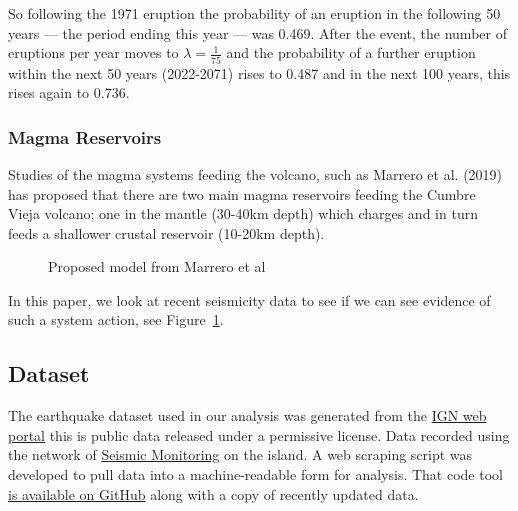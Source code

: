 \documentclass[
]{agujournal2019}
\begin{document}
So following the 1971 eruption the probability of an eruption in the
following 50 years --- the period ending this year --- was 0.469. After
the event, the number of eruptions per year moves to
\(\lambda=\frac{1}{75}\) and the probability of a further eruption
within the next 50 years (2022-2071) rises to 0.487 and in the next 100
years, this rises again to 0.736.

\subsubsection{Magma Reservoirs}\label{magma-reservoirs}

Studies of the magma systems feeding the volcano, such as Marrero et al.
(2019) has proposed that there are two main magma reservoirs feeding the
Cumbre Vieja volcano; one in the mantle (30-40km depth) which charges
and in turn feeds a shallower crustal reservoir (10-20km depth).

\begin{figure}


\caption{\label{fig-reservoirs}Proposed model from Marrero et al}

\end{figure}%

In this paper, we look at recent seismicity data to see if we can see
evidence of such a system action, see Figure~\ref{fig-reservoirs}.

\subsection{Dataset}\label{dataset}

The earthquake dataset used in our analysis was generated from the
\href{https://www.ign.es/web/resources/volcanologia/tproximos/canarias.html}{IGN
web portal} this is public data released under a permissive license.
Data recorded using the network of
\href{notebooks/seismic-monitoring-stations.qmd}{Seismic Monitoring} on
the island. A web scraping script was developed to pull data into a
machine-readable form for analysis. That code tool
\href{https://github.com/stevejpurves/ign-earthquake-data}{is available
on GitHub} along with a copy of recently updated data.
\end{document}
